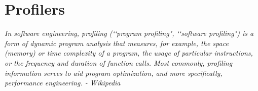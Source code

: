 \section{Profilers}

\textsl{In software engineering, profiling (\lq\lq program profiling",
  \lq\lq software profiling") is a form of dynamic program analysis that measures, for example, the space (memory) or time complexity of a program, the usage of particular instructions, or the frequency and duration of function calls. Most commonly, profiling information serves to aid program optimization, and more specifically, performance engineering.
\hfill    - Wikipedia
}

\newpage
\newpage
